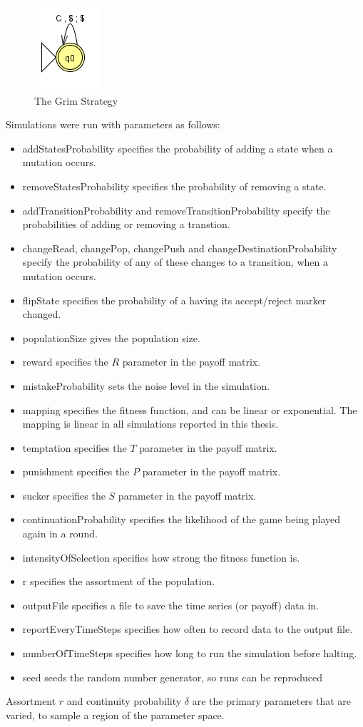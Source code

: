 \documentclass[a4paper,11pt,bcshonoursthesis,singlespace,oneside,thesisdraft,pdflatex]{cssethesis}
\begin{document}
\begin{figure}[h]
\centering
\includegraphics{grim}
\caption{The Grim Strategy}
\label{fig:grim}
\end{figure}
\pagebreak
Simulations were run with parameters as follows:

\begin{itemize}
\item addStatesProbability specifies the probability of adding a state when a mutation occurs. 
\item removeStatesProbability specifies the probability of removing a state.
\item addTransitionProbability and removeTransitionProbability specify the probabilities of adding or removing a transtion.
\item changeRead, changePop, changePush and changeDestinationProbability specify the probability of any of these changes to a transition, when a mutation occurs.
\item flipState specifies the probability of a having its accept/reject marker changed.
\item populationSize gives the population size.
\item reward specifies the $R$ parameter in the payoff matrix.
\item mistakeProbability sets the noise level in the simulation.
\item mapping specifies the fitness function, and can be linear or exponential. The mapping is linear in all simulations reported in this thesis.
\item temptation specifies the $T$ parameter in the payoff matrix.
\item punishment specifies the $P$ parameter in the payoff matrix.
\item sucker specifies the $S$ parameter in the payoff matrix.
\item continuationProbability specifies the likelihood of the game being played again in a round.
\item intensityOfSelection specifies how strong the fitness function is.
\item r specifies the assortment of the population.
\item outputFile specifies a file to save the time series (or payoff) data in.
\item reportEveryTimeSteps specifies how often to record data to the output file.
\item numberOfTimeSteps specifies how long to run the simulation before halting.
\item seed seeds the random number generator, so runs can be reproduced
\end{itemize}
Assortment $r$ and continuity probability $\delta$ are the primary parameters that are varied, to sample a region of the parameter space. 
\end{document}
